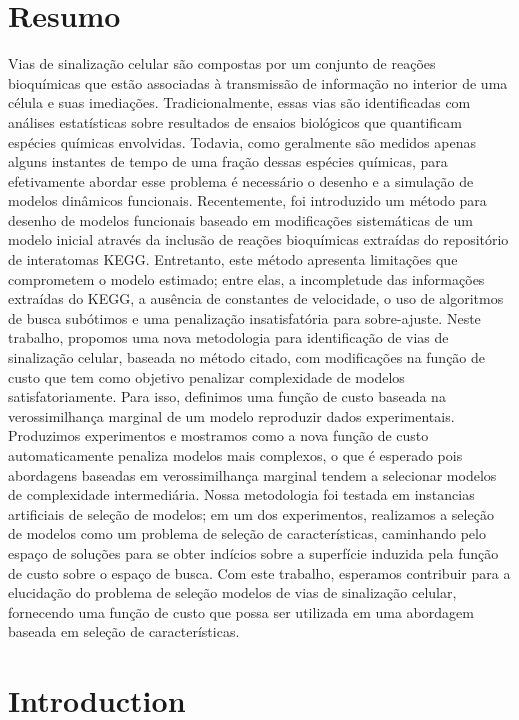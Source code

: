 \documentclass[12pt, twoside]{report}
\numberwithin{mydefinition}{section}
\numberwithin{mytheorem}{section}
\numberwithin{mylemma}{section}
\numberwithin{corollary}{section}
\begin{document}
\chapter*{Resumo}
Vias de sinalização celular são compostas por um conjunto de reações
bioquímicas que estão associadas à transmissão de informação no interior
de uma célula e suas imediações. Tradicionalmente, essas vias são
identificadas com análises estatísticas sobre resultados de ensaios
biológicos que quantificam espécies químicas envolvidas. Todavia, como
geralmente são medidos apenas alguns instantes de tempo de uma fração
dessas espécies químicas, para efetivamente abordar esse problema é
necessário o desenho e a simulação de modelos dinâmicos funcionais.
Recentemente, foi introduzido um método para desenho de modelos
funcionais baseado em modificações sistemáticas de um modelo inicial
através da inclusão de reações bioquímicas extraídas do repositório de
interatomas KEGG. Entretanto, este método apresenta limitações que
comprometem o modelo estimado; entre elas, a incompletude das
informações extraídas do KEGG, a ausência de constantes de velocidade, o
uso de algoritmos de busca subótimos e uma penalização insatisfatória
para sobre-ajuste. Neste trabalho, propomos uma nova metodologia para
identificação de vias de sinalização celular, baseada no método citado,
com modificações na função de custo que tem como objetivo penalizar
complexidade de modelos satisfatoriamente. Para isso, definimos uma
função de custo baseada na verossimilhança marginal de um modelo 
reproduzir dados experimentais. Produzimos experimentos e mostramos como
a nova função de custo automaticamente penaliza modelos mais complexos,
o que é esperado pois abordagens baseadas em verossimilhança marginal
tendem a selecionar modelos de complexidade intermediária. Nossa
metodologia foi testada em instancias artificiais de seleção de modelos;
em um dos experimentos, realizamos a seleção de modelos como um problema
de seleção de características, caminhando pelo espaço de soluções para
se obter indícios sobre a superfície induzida pela função de custo sobre
o espaço de busca. Com este trabalho, esperamos contribuir para a 
elucidação do problema de seleção modelos de vias de sinalização celular,
fornecendo uma função de custo que possa ser utilizada em uma abordagem
baseada em seleção de características.

\tableofcontents

\clearpage
{} 

\nocite{*}
\chapter{Introduction}
\label{chap:intro}

\end{document}
